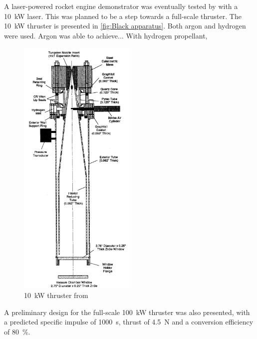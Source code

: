         A laser-powered rocket engine demonstrator was eventually tested by \textcite{blackLaserPropulsion10kW1995} with a \qty{10}{kW}  laser. This was planned to be a step towards a full-scale thruster. The \qty{10}{kW} thruster is presented in \autoref{fig:Black apparatus}. Both argon and hydrogen were used. Argon was able to achieve... With hydrogen propellant,
        \begin{figure}[!ht]
            \centering
            \includegraphics[width=0.5\textwidth]{assets/2 background/BlackKrier thruster.png}
            \caption{\qty{10}{kW} thruster from \textcite{blackLaserPropulsion10kW1995}}
            \label{fig:Black apparatus}
        \end{figure}
        A preliminary design for the full-scale \qty{100}{kW} thruster was also presented, with a predicted specific impulse of \qty{1000}{s}, thrust of \qty{4.5}{N} and a conversion efficiency of \qty{80}{\%}.


